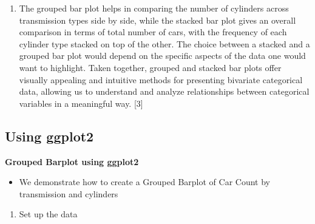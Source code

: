 \documentclass[
  letterpaper,
  DIV=11,
  numbers=noendperiod]{scrreport}
\newenvironment{Shaded}{\begin{snugshade}}{\end{snugshade}}
\newcommand{\AttributeTok}[1]{\textcolor[rgb]{0.40,0.45,0.13}{#1}}
\newcommand{\CommentTok}[1]{\textcolor[rgb]{0.37,0.37,0.37}{#1}}
\newcommand{\FunctionTok}[1]{\textcolor[rgb]{0.28,0.35,0.67}{#1}}
\newcommand{\NormalTok}[1]{\textcolor[rgb]{0.00,0.23,0.31}{#1}}
\newcommand{\OtherTok}[1]{\textcolor[rgb]{0.00,0.23,0.31}{#1}}
\newcommand{\SpecialCharTok}[1]{\textcolor[rgb]{0.37,0.37,0.37}{#1}}
\newcommand{\StringTok}[1]{\textcolor[rgb]{0.13,0.47,0.30}{#1}}
\providecommand{\tightlist}{%
  \setlength{\itemsep}{0pt}\setlength{\parskip}{0pt}}\usepackage{longtable,booktabs,array}
\begin{document}
\begin{enumerate}
\def\labelenumi{\arabic{enumi}.}
\setcounter{enumi}{5}
\tightlist
\item
  The grouped bar plot helps in comparing the number of cylinders across
  transmission types side by side, while the stacked bar plot gives an
  overall comparison in terms of total number of cars, with the
  frequency of each cylinder type stacked on top of the other. The
  choice between a stacked and a grouped bar plot would depend on the
  specific aspects of the data one would want to highlight. Taken
  together, grouped and stacked bar plots offer visually appealing and
  intuitive methods for presenting bivariate categorical data, allowing
  us to understand and analyze relationships between categorical
  variables in a meaningful way. {[}3{]}
\end{enumerate}

\hypertarget{using-ggplot2}{%
\subsection{\texorpdfstring{Using
\textbf{ggplot2}}{Using ggplot2}}\label{using-ggplot2}}

\textbf{Grouped Barplot using ggplot2}

\begin{itemize}
\tightlist
\item
  We demonstrate how to create a Grouped Barplot of Car Count by
  transmission and cylinders
\end{itemize}

\begin{enumerate}
\def\labelenumi{\arabic{enumi}.}
\tightlist
\item
  Set up the data
\end{enumerate}

\begin{Shaded}
\end{Shaded}
\end{document}
